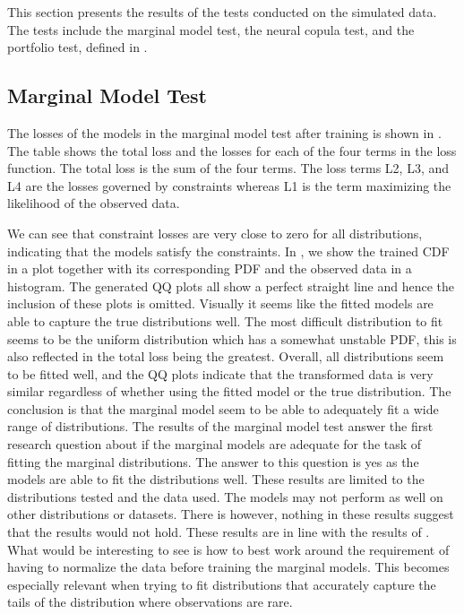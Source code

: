 This section presents the results of the tests conducted on the simulated data. The tests include the marginal model test, the neural copula test, and the portfolio test, defined in .

\subsection{Marginal Model Test}
The losses of the models in the marginal model test after training is shown in . The table shows the total loss and the losses for each of the four terms in the loss function. The total loss is the sum of the four terms. The loss terms L2, L3, and L4 are the losses governed by constraints whereas L1 is the term maximizing the likelihood of the observed data. 

We can see that constraint losses are very close to zero for all distributions, indicating that the models satisfy the constraints. In , we show the trained \gls{CDF} in a plot together with its corresponding \gls{PDF} and the observed data in a histogram. The generated QQ plots all show a perfect straight line and hence the inclusion of these plots is omitted. Visually it seems like the fitted models are able to capture the true distributions well. The most difficult distribution to fit seems to be the uniform distribution which has a somewhat unstable \gls{PDF}, this is also reflected in the total loss being the greatest. Overall, all distributions seem to be fitted well, and the QQ plots indicate that the transformed data is very similar regardless of whether using the fitted model or the true distribution. The conclusion is that the marginal model seem to be able to adequately fit a wide range of distributions. The results of the marginal model test answer the first research question \RQone about if the marginal models are adequate for the task of fitting the marginal distributions. The answer to this question is yes as the models are able to fit the distributions well. These results are limited to the distributions tested and the data used. The models may not perform as well on other distributions or datasets. There is however, nothing in these results suggest that the results would not hold. These results are in line with the results of . What would be interesting to see is how to best work around the requirement of having to normalize the data before training the marginal models. This becomes especially relevant when trying to fit distributions that accurately capture the tails of the distribution where observations are rare.  


